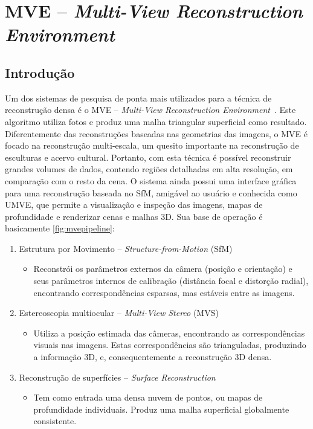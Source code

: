 \section{MVE -- \emph{Multi-View Reconstruction Environment}}\label{sec:mve}
%
\subsection*{Introdução}
Um dos sistemas de pesquisa de ponta mais utilizados para a técnica de reconstrução densa é o MVE --
\emph{Multi-View Reconstruction Environment}~\cite{mve}. Este algoritmo utiliza
fotos e produz uma malha triangular superficial como resultado. Diferentemente
das reconstruções baseadas nas geometrias das imagens, o MVE é focado na
reconstrução multi-escala, um quesito importante na reconstrução de esculturas e
acervo cultural. Portanto, com esta técnica é possível reconstruir grandes
volumes de dados, contendo regiões detalhadas em alta resolução, em comparação
com o resto da cena. O sistema ainda possui uma interface gráfica para uma
reconstrução baseada no SfM, amigável ao usuário e conhecida como UMVE, que
permite a visualização e inspeção das imagens, mapas de profundidade e
renderizar cenas e malhas 3D. Sua base de operação é basicamente
\ref{fig:mvepipeline}:
\begin{enumerate}
\item{Estrutura por Movimento -- \emph{Structure-from-Motion} (SfM)}

\begin{itemize}
\item{
Reconstrói os parâmetros externos da câmera (posição e orientação) e seus
parâmetros internos de calibração (distância focal e distorção radial), encontrando correspondências
esparsas, mas estáveis entre as imagens.
}
\end{itemize}

\item{Estereoscopia multiocular -- \emph{Multi-View Stereo} (MVS)}
\begin{itemize}
\item{
Utiliza a posição estimada das câmeras, encontrando as correspondências visuais
nas imagens. Estas correspondências são trianguladas, produzindo a informação
3D, e, consequentemente a reconstrução 3D densa.
} 
\end{itemize}
\item{Reconstrução de superfícies -- \emph{Surface Reconstruction}}
\begin{itemize}
\item{
Tem como entrada uma densa nuvem de pontos, ou mapas de profundidade
individuais. Produz uma malha superficial globalmente consistente.
}
\end{itemize}
\end{enumerate}

